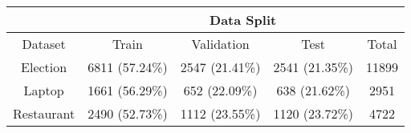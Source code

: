 \begin{tabular}{|c|c|c|c|c|}
\hline
        & \multicolumn{4}{c|}{Data Split} \\
\hline
Dataset &          Train &     Validation &           Test &  Total \\
\hline
Election   &  6811 (57.24\%) &  2547 (21.41\%) &  2541 (21.35\%) &  11899 \\
\hline
Laptop     &  1661 (56.29\%) &   652 (22.09\%) &   638 (21.62\%) &   2951 \\
\hline
Restaurant &  2490 (52.73\%) &  1112 (23.55\%) &  1120 (23.72\%) &   4722 \\
\hline
\end{tabular}